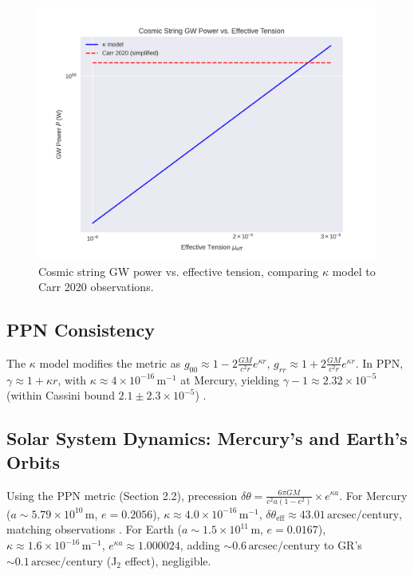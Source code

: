 \documentclass[a4paper,12pt]{article}
\begin{document}
\begin{figure}[H]
    \centering
    \includegraphics[width=0.8\linewidth]{figure13.png}
    \caption{Cosmic string GW power vs. effective tension, comparing $\kappa$ model to Carr 2020 observations.}
    \label{fig:13}
\end{figure}

\subsection{PPN Consistency}
The $\kappa$ model modifies the metric as $g_{00} \approx 1 - 2 \frac{G M}{c^2 r} e^{\kappa r}$, $g_{rr} \approx 1 + 2 \frac{G M}{c^2 r} e^{\kappa r}$. In PPN, $\gamma \approx 1 + \kappa r$, with $\kappa \approx 4 \times 10^{-16} \, \text{m}^{-1}$ at Mercury, yielding $\gamma - 1 \approx 2.32 \times 10^{-5}$ (within Cassini bound $2.1 \pm 2.3 \times 10^{-5}$) \citep{Bertotti2003}.

\subsection{Solar System Dynamics: Mercury’s and Earth’s Orbits}
Using the PPN metric (Section 2.2), precession $\delta\theta = \frac{6\pi G M}{c^2 a (1 - e^2)} \times e^{\kappa a}$. For Mercury ($a \sim 5.79 \times 10^{10} \, \text{m}$, $e=0.2056$), $\kappa \approx 4.0 \times 10^{-16} \, \text{m}^{-1}$, $\delta\theta_{\mathrm{eff}} \approx 43.01 \, \text{arcsec/century}$, matching observations \citep{Clemence1947}. For Earth ($a \sim 1.5 \times 10^{11} \, \text{m}$, $e=0.0167$), $\kappa \approx 1.6 \times 10^{-16} \, \text{m}^{-1}$, $e^{\kappa a} \approx 1.000024$, adding $\sim 0.6 \, \text{arcsec/century}$ to GR’s $\sim 0.1 \, \text{arcsec/century}$ (J$_2$ effect), negligible.
\end{document}
